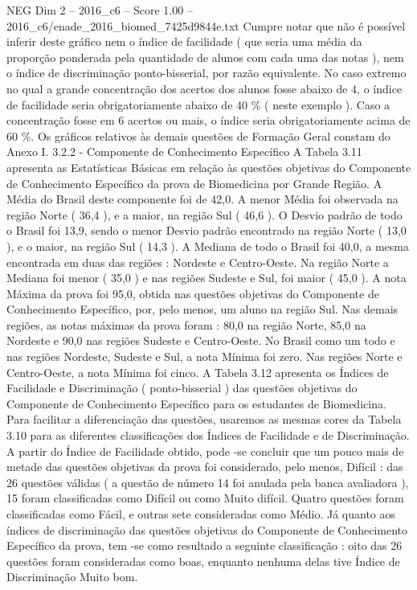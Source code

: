 \begin{textsample}{NEG Dim 2 – 2016\_c6 – Score 1.00 – 2016\_c6/enade\_2016\_biomed\_7425d9844e.txt}
Cumpre notar que não é possível inferir deste gráfico nem o índice de facilidade ( que seria uma média da proporção ponderada pela quantidade de alunos com cada uma das notas ), nem o índice de discriminação ponto-bisserial, por razão equivalente.
No caso extremo no qual a grande concentração dos acertos dos alunos fosse abaixo de 4, o índice de facilidade seria obrigatoriamente abaixo de 40 \% ( neste exemplo ).
Caso a concentração fosse em 6 acertos ou mais, o índice seria obrigatoriamente acima de 60 \%.
Os gráficos relativos às demais questões de Formação Geral constam do Anexo I. 3.2.2 - Componente de Conhecimento Específico A Tabela 3.11 apresenta as Estatísticas Básicas em relação às questões objetivas do Componente de Conhecimento Específico da prova de Biomedicina por Grande Região.
A Média do Brasil deste componente foi de 42,0.
A menor Média foi observada na região Norte ( 36,4 ), e a maior, na região Sul ( 46,6 ).
O Desvio padrão de todo o Brasil foi 13,9, sendo o menor Desvio padrão encontrado na região Norte ( 13,0 ), e o maior, na região Sul ( 14,3 ).
A Mediana de todo o Brasil foi 40,0, a mesma encontrada em duas das regiões : Nordeste e Centro-Oeste.
Na região Norte a Mediana foi menor ( 35,0 ) e nas regiões Sudeste e Sul, foi maior ( 45,0 ).
A nota Máxima da prova foi 95,0, obtida nas questões objetivas do Componente de Conhecimento Específico, por, pelo menos, um aluno na região Sul.
Nas demais regiões, as notas máximas da prova foram : 80,0 na região Norte, 85,0 na Nordeste e 90,0 nas regiões Sudeste e Centro-Oeste.
No Brasil como um todo e nas regiões Nordeste, Sudeste e Sul, a nota Mínima foi zero.
Nas regiões Norte e Centro-Oeste, a nota Mínima foi cinco.
A Tabela 3.12 apresenta os Índices de Facilidade e Discriminação ( ponto-bisserial ) das questões objetivas do Componente de Conhecimento Específico para os estudantes de Biomedicina.
Para facilitar a diferenciação das questões, usaremos as mesmas cores da Tabela 3.10 para as diferentes classificações dos Índices de Facilidade e de Discriminação.
A partir do Índice de Facilidade obtido, pode -se concluir que um pouco mais de metade das questões objetivas da prova foi considerado, pelo menos, Difícil : das 26 questões válidas ( a questão de número 14 foi anulada pela banca avaliadora ), 15 foram classificadas como Difícil ou como Muito difícil.
Quatro questões foram classificadas como Fácil, e outras sete consideradas como Médio.
Já quanto aos índices de discriminação das questões objetivas do Componente de Conhecimento Específico da prova, tem -se como resultado a seguinte classificação : oito das 26 questões foram consideradas como boas, enquanto nenhuma delas tive Índice de Discriminação Muito bom.

\end{textsample}
